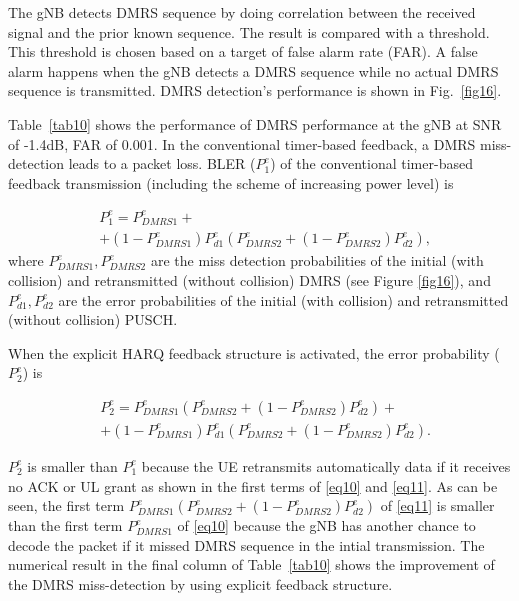 \documentclass{ieeeaccess}
\begin{document}
The gNB detects DMRS sequence by doing correlation between the received signal and the prior known sequence. The result is compared with a threshold. This threshold is chosen based on a target of false alarm rate (FAR). A false alarm happens when the gNB detects a DMRS sequence while no actual DMRS sequence is transmitted. DMRS detection's performance is shown in Fig.~\ref{fig16}.

Table~\ref{tab10} shows the performance of DMRS performance at the gNB at SNR of -1.4dB, FAR of 0.001. In the conventional timer-based feedback, a DMRS miss-detection leads to a packet loss. BLER ($ P^{e}_{1}$) of the conventional timer-based feedback transmission (including the scheme of increasing power level) is 

\begin{equation}
\begin{split}
 &P^{e}_{1} = P^{e}_{DMRS1} + \\
        &+ (1-P^{e}_{DMRS1})P^{e}_{d1}(P^{e}_{DMRS2} + (1-P^{e}_{DMRS2})P^{e}_{d2}),\label{eq10}   
\end{split}
\end{equation}
where $ P^{e}_{DMRS1}, P^{e}_{DMRS2}$ are the miss detection probabilities of the initial (with collision) and retransmitted (without collision) DMRS (see Figure \ref{fig16}), and $P^{e}_{d1}, P^{e}_{d2}$ are the error probabilities of the initial (with collision) and retransmitted (without collision) PUSCH.


When the explicit HARQ feedback structure is activated, the error probability ($ P^{e}_{2}$)  is 

\begin{equation}
\begin{split}
 &P^{e}_{2} = P^{e}_{DMRS1}(P^{e}_{DMRS2} + (1-P^{e}_{DMRS2})P^{e}_{d2}) + \\
        &+ (1-P^{e}_{DMRS1})P^{e}_{d1}(P^{e}_{DMRS2} + (1-P^{e}_{DMRS2})P^{e}_{d2}).\label{eq11}   
\end{split}
\end{equation}

$ P^{e}_{2}$ is smaller than $ P^{e}_{1}$ because the UE retransmits automatically data if it receives no ACK or UL grant as shown in the first terms of \eqref{eq10} and \eqref{eq11}. As can be seen, the first term $P^{e}_{DMRS1}(P^{e}_{DMRS2} + (1-P^{e}_{DMRS2})P^{e}_{d2})$ of \eqref{eq11} is smaller than the first term $P^{e}_{DMRS1}$ of \eqref{eq10} because the gNB has another chance to decode the packet if it missed DMRS sequence in the intial transmission. The numerical result in the final column of Table~\ref{tab10} shows the improvement of the DMRS miss-detection by using explicit feedback structure.
\end{document}
